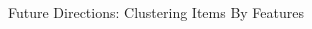 \documentclass[final,t]{beamer}
\begin{document}
\begin{frame}{}
\begin{columns}[t]
\begin{column}{.64\linewidth}
\begin{block}{Future Directions: Clustering Items By Features}
\bigskip
\bigskip


\end{block}
\end{column}
\end{columns}
\end{frame}
\end{document}
